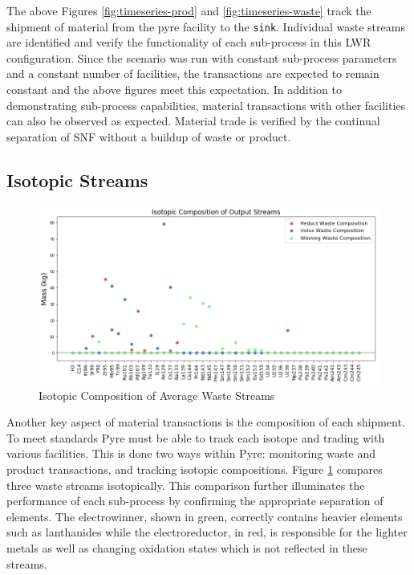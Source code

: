 The above Figures \ref{fig:timeseries-prod} and \ref{fig:timeseries-waste} track the shipment of material from the pyre facility to the \texttt{sink}.
Individual waste streams are identified and verify the functionality of each sub-process in this LWR configuration. Since the scenario was run with
constant sub-process parameters and a constant number of facilities, the transactions are expected to remain constant and the above figures meet this expectation.
In addition to demonstrating sub-process capabilities, material transactions with other \Cyclus facilities can also be observed as expected. Material trade is verified by the continual separation of SNF without a buildup of waste or product.

\subsection{Isotopic Streams}
\begin{figure} [h]
	\includegraphics[width=\linewidth]{images/avg-isotope-comp}
	\caption{Isotopic Composition of Average Waste Streams}
	\label{fig:avg-isotope-comp}
\end{figure}

Another key aspect of material transactions is the composition of each shipment. To meet \Cyclus standards Pyre must be able to track each isotope and trading with various facilities. This is done two ways within Pyre: monitoring waste and product transactions, and tracking isotopic compositions.
Figure \ref{fig:avg-isotope-comp} compares three waste streams isotopically. This comparison further illuminates the performance of each sub-process by confirming the appropriate separation of elements.
The electrowinner, shown in green, correctly contains heavier elements such as lanthanides while the electroreductor, in red, is responsible for the lighter metals
as well as changing oxidation states which is not reflected in these streams.

